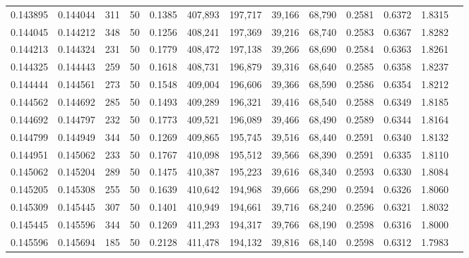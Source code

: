 \begin{tabular}{rrrrrrrrrrrrr}
0.143895 & 0.144044 &   311 &  50 &                                     0.1385 & 407,893 & 197,717 &  39,166 &  68,790 & 0.2581 & 0.6372 & 1.8315 \\
0.144045 & 0.144212 &   348 &  50 &                                     0.1256 & 408,241 & 197,369 &  39,216 &  68,740 & 0.2583 & 0.6367 & 1.8282 \\
0.144213 & 0.144324 &   231 &  50 &                                     0.1779 & 408,472 & 197,138 &  39,266 &  68,690 & 0.2584 & 0.6363 & 1.8261 \\
0.144325 & 0.144443 &   259 &  50 &                                     0.1618 & 408,731 & 196,879 &  39,316 &  68,640 & 0.2585 & 0.6358 & 1.8237 \\
0.144444 & 0.144561 &   273 &  50 &                                     0.1548 & 409,004 & 196,606 &  39,366 &  68,590 & 0.2586 & 0.6354 & 1.8212 \\
0.144562 & 0.144692 &   285 &  50 &                                     0.1493 & 409,289 & 196,321 &  39,416 &  68,540 & 0.2588 & 0.6349 & 1.8185 \\
0.144692 & 0.144797 &   232 &  50 &                                     0.1773 & 409,521 & 196,089 &  39,466 &  68,490 & 0.2589 & 0.6344 & 1.8164 \\
0.144799 & 0.144949 &   344 &  50 &                                     0.1269 & 409,865 & 195,745 &  39,516 &  68,440 & 0.2591 & 0.6340 & 1.8132 \\
0.144951 & 0.145062 &   233 &  50 &                                     0.1767 & 410,098 & 195,512 &  39,566 &  68,390 & 0.2591 & 0.6335 & 1.8110 \\
0.145062 & 0.145204 &   289 &  50 &                                     0.1475 & 410,387 & 195,223 &  39,616 &  68,340 & 0.2593 & 0.6330 & 1.8084 \\
0.145205 & 0.145308 &   255 &  50 &                                     0.1639 & 410,642 & 194,968 &  39,666 &  68,290 & 0.2594 & 0.6326 & 1.8060 \\
0.145309 & 0.145445 &   307 &  50 &                                     0.1401 & 410,949 & 194,661 &  39,716 &  68,240 & 0.2596 & 0.6321 & 1.8032 \\
0.145445 & 0.145596 &   344 &  50 &                                     0.1269 & 411,293 & 194,317 &  39,766 &  68,190 & 0.2598 & 0.6316 & 1.8000 \\
0.145596 & 0.145694 &   185 &  50 &                                     0.2128 & 411,478 & 194,132 &  39,816 &  68,140 & 0.2598 & 0.6312 & 1.7983 \\

\end{tabular}
